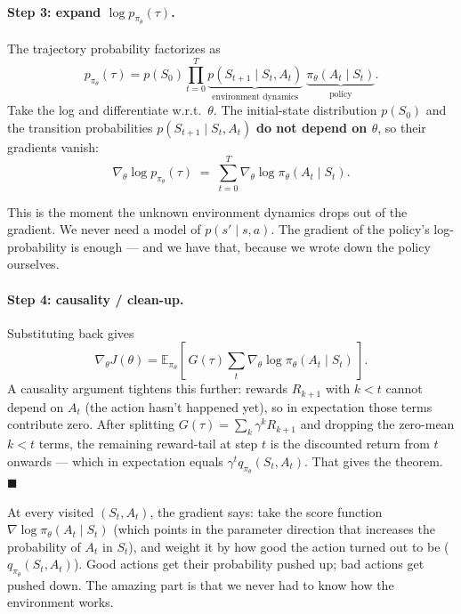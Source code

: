 \documentclass[11pt, oneside]{book}
\newcommand{\E}{\mathbb{E}}              %
\begin{document}
\paragraph{Step 3: expand $\log p_{\pi_\theta}(\tau)$.}
The trajectory probability factorizes as
\[
  p_{\pi_\theta}(\tau)
  = p(S_0) \prod_{t=0}^{T} \underbrace{p(S_{t+1} \mid S_t, A_t)}_{\text{environment dynamics}}\;
                          \underbrace{\pi_\theta(A_t \mid S_t)}_{\text{policy}}.
\]
Take the log and differentiate w.r.t.\ $\theta$.
The initial-state distribution $p(S_0)$ and the transition probabilities
$p(S_{t+1} \mid S_t, A_t)$ \textbf{do not depend on $\theta$}, so their gradients
vanish:
\[
  \nabla_\theta \log p_{\pi_\theta}(\tau)
  \;=\; \sum_{t=0}^{T} \nabla_\theta \log \pi_\theta(A_t \mid S_t).
\]

\begin{intbox}[title={The key step}]
This is the moment the unknown environment dynamics drops out of the gradient.
We never need a model of $p(s' \mid s, a)$. The gradient of the policy's
log-probability is enough --- and we have that, because we wrote down the policy
ourselves.
\end{intbox}

\paragraph{Step 4: causality / clean-up.}
Substituting back gives
\[
  \nabla_\theta J(\theta)
  = \E_{\pi_\theta}\!\left[\, G(\tau) \sum_t \nabla_\theta \log \pi_\theta(A_t \mid S_t)\, \right].
\]
A causality argument tightens this further: rewards $R_{k+1}$ with $k < t$ cannot
depend on $A_t$ (the action hasn't happened yet), so in expectation those terms
contribute zero.
After splitting $G(\tau) = \sum_k \gamma^k R_{k+1}$ and dropping the zero-mean
$k < t$ terms, the remaining reward-tail at step $t$ is the discounted return from
$t$ onwards --- which in expectation equals $\gamma^t q_{\pi_\theta}(S_t, A_t)$.
That gives the theorem. $\blacksquare$

\begin{intbox}[title={What the policy gradient is doing}]
At every visited $(S_t, A_t)$, the gradient says: take the score function
$\nabla \log \pi_\theta(A_t \mid S_t)$ (which points in the parameter direction
that increases the probability of $A_t$ in $S_t$), and weight it by how good the
action turned out to be ($q_{\pi_\theta}(S_t, A_t)$).
Good actions get their probability pushed up; bad actions get pushed down.
The amazing part is that we never had to know how the environment works.
\end{intbox}
\end{document}
